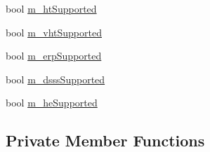 \begin{DoxyCompactItemize}
bool \hyperlink{classns3_1_1RegularWifiMac_a8950c44b8cf2ad1f9274821cf88adc7b}{m\+\_\+ht\+Supported}
\item 
bool \hyperlink{classns3_1_1RegularWifiMac_a151f330fdeb3f83f9ec7cf07537f0e86}{m\+\_\+vht\+Supported}
\item 
bool \hyperlink{classns3_1_1RegularWifiMac_ab90230e9a9ea6331758a53a316ee2b38}{m\+\_\+erp\+Supported}
\item 
bool \hyperlink{classns3_1_1RegularWifiMac_ab6ce267a1e23e9c1d84908e07831bd6d}{m\+\_\+dsss\+Supported}
\item 
bool \hyperlink{classns3_1_1RegularWifiMac_a9458143c722fa0b6e5d223d41585842a}{m\+\_\+he\+Supported}
\end{DoxyCompactItemize}
\subsection*{Private Member Functions}
